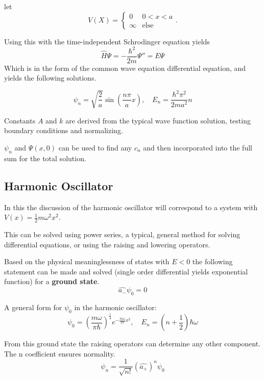 let
\[
V(X) =
\begin{cases}
  0 & 0<x<a\\
  \infty & \text{else}
\end{cases}.\] 

Using this with the time-independent Schrodinger equation yields
\begin{equation}
  \hat{H}\Psi=-\frac{\hbar^2}{2m}\Psi''=E\Psi
\end{equation}
Which is in the form of the common wave equation differential equation, and yields the following solutions. 

\begin{equation}
  \psi_n=\sqrt{\frac{2}{a}}\sin(\frac{n \pi}{a}x),\quad E_{n}=\frac{\hbar^2 \pi^2}{2ma^2}n
\end{equation}

Constants $ A $ and $ k $ are derived from the typical wave function solution, testing boundary conditions and normalizing.


$ \psi_{n} $ and $ \Psi(x,0) $ can be used to find any $ c_{n} $ and then incorporated into the full sum for the total solution.




\subsection{Harmonic Oscillator}
In this the discussion of the harmonic oscillator will correspond to a system with $ V(x)=\frac{1}{2}m\omega^2 x^2 $. 

This can be solved using power series, a typical, general method for solving differential equations, or using the raising and lowering operators.

Based on the physical meaninglessness of states with $ E<0 $ the following statement can be made and solved (single order differential yields exponential function) for a \textbf{ground state}.
\begin{equation}
  \hat{a_{-}}\psi_0=0
\end{equation}

  A general form for $ \psi_0 $ in the harmonic oscillator: 
\begin{equation}
  \psi_0=(\frac{m\omega}{\pi\hbar})^{\frac{1}{4}}e^{- \frac{m\omega}{2\hbar}x^2},\quad E_{n}=(n+\frac{1}{2})\hbar \omega
\end{equation}

From this ground state the raising operators can determine any other component. The n coefficient ensures normality.
\begin{equation}
  \psi_{n}=\frac{1}{\sqrt{n!}}(\hat{a_{+}})^{n}\psi_0
\end{equation}

